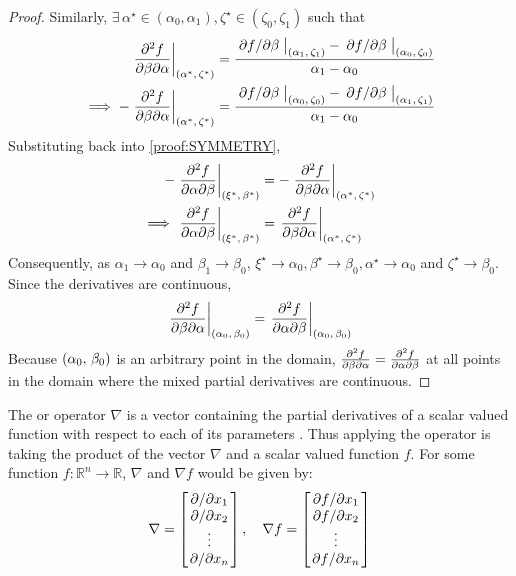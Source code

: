 \begin{theorem}
\begin{proof}
		Similarly, $\exists\,\alpha^\star\in(\alpha_0,\alpha_1),\zeta^\star\in(\zeta_0,\zeta_1)$ such that
		\begin{align*}
			\eval{\pdv{f}{\beta}{\alpha}}_{\point{\alpha^\star}{\zeta^\star}}&=\frac{\eval{\pdv*{f}{\beta}}_{\point{\alpha_1}{\zeta_1}}-\eval{\pdv*{f}{\beta}}_{\point{\alpha_0}{\zeta_0}}}{\alpha_1-\alpha_0}\\
			\implies-\eval{\pdv{f}{\beta}{\alpha}}_{\point{\alpha^\star}{\zeta^\star}}&=\frac{\eval{\pdv*{f}{\beta}}_{\point{\alpha_0}{\zeta_0}}-\eval{\pdv*{f}{\beta}}_{\point{\alpha_1}{\zeta_1}}}{\alpha_1-\alpha_0}
		\end{align*}
		Substituting back into \eqref{proof:SYMMETRY},
		\begin{align*}
			-\eval{\pdv{f}{\alpha}{\beta}}_{\point{\xi^\star}{\beta^\star}}&=-\eval{\pdv{f}{\beta}{\alpha}}_{\point{\alpha^\star}{\zeta^\star}}\\
			\implies\eval{\pdv{f}{\alpha}{\beta}}_{\point{\xi^\star}{\beta^\star}}&=\eval{\pdv{f}{\beta}{\alpha}}_{\point{\alpha^\star}{\zeta^\star}}
		\end{align*}
		Consequently, as $\alpha_1\rightarrow\alpha_0$ and $\beta_1\rightarrow\beta_0$, $\xi^\star\rightarrow\alpha_0,\beta^\star\rightarrow\beta_0,\alpha^\star\rightarrow\alpha_0$ 
		and $\zeta^\star\rightarrow\beta_0$. Since the derivatives are continuous,
		$$
			\eval{\pdv{f}{\beta}{\alpha}}_{\point{\alpha_0}{\beta_0}}=\eval{\pdv{f}{\alpha}{\beta}}_{\point{\alpha_0}{\beta_0}}
		$$
		Because $\left(\alpha_0,\,\beta_0\right)$ is an arbitrary point in the domain, $\pdv{f}{\beta}{\alpha}=\pdv{f}{\alpha}{\beta}$ at 
		all points in the domain where the mixed partial derivatives are continuous.
	\end{proof}
\end{theorem}
\begin{defn}
	The  or  operator $\nabla$ is a vector containing the partial derivatives of a scalar valued function with
	respect to each of its parameters \cite{RAPP2017137}. Thus applying the operator is taking the product of the vector $\nabla$ and a scalar valued
	function $f$. For some function $f:\mathbb{R}^n\rightarrow\mathbb{R}$, $\nabla$ and $\nabla f$ would be given by:
	$$
		\nabla=\begin{bmatrix}
			\pdv*{x_1}\\
			\pdv*{x_2}\\
			\vdots\\
			\pdv*{x_n}
		\end{bmatrix}\qc
		\nabla f=\begin{bmatrix}
			\pdv*{f}{x_1}\\
			\pdv*{f}{x_2}\\
			\vdots\\
			\pdv*{f}{x_n}
		\end{bmatrix}
	$$
\end{defn}

